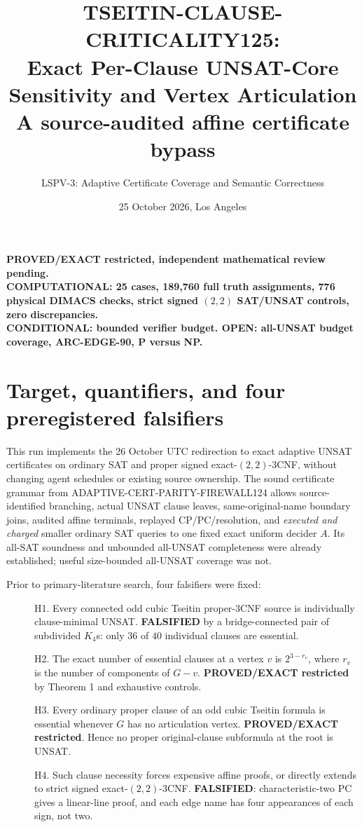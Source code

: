 \documentclass[11pt]{article}
\title{TSEITIN-CLAUSE-CRITICALITY125:\\Exact Per-Clause UNSAT-Core Sensitivity and Vertex Articulation\\\large A source-audited affine certificate bypass}
\author{LSPV-3: Adaptive Certificate Coverage and Semantic Correctness}
\date{25 October 2026, Los Angeles}
\begin{document}
\maketitle
\begin{center}
\textbf{PROVED/EXACT restricted, independent mathematical review pending.}\\
\textbf{COMPUTATIONAL: 25 cases, 189,760 full truth assignments, 776 physical DIMACS checks, strict signed $(2,2)$ SAT/UNSAT controls, zero discrepancies.}\\
\textbf{CONDITIONAL: bounded verifier budget. OPEN: all-UNSAT budget coverage, ARC-EDGE-90, P versus NP.}
\end{center}

\section{Target, quantifiers, and four preregistered falsifiers}
This run implements the 26 October UTC redirection to exact adaptive
UNSAT certificates on ordinary SAT and proper signed exact-$(2,2)$-3CNF,
without changing agent schedules or existing source ownership.
The sound certificate grammar from ADAPTIVE-CERT-PARITY-FIREWALL124
allows source-identified branching, actual UNSAT clause leaves,
same-original-name boundary joins, audited affine terminals, replayed
CP/PC/resolution, and \emph{executed and charged} smaller ordinary SAT
queries to one fixed exact uniform decider $A$.
Its all-SAT soundness and unbounded all-UNSAT completeness were already
established; useful size-bounded all-UNSAT coverage was not.

Prior to primary-literature search, four falsifiers were fixed:
\begin{description}
\item[] H1. Every connected odd cubic Tseitin proper-3CNF source
is individually clause-minimal UNSAT.
\textbf{FALSIFIED} by a bridge-connected pair of subdivided $K_4$s:
only $36$ of $40$ individual clauses are essential.
\item[] H2. The exact number of essential clauses at a vertex $v$
is $2^{3-r_v}$, where $r_v$ is the number of components of $G-v$.
\textbf{PROVED/EXACT restricted} by Theorem 1 and exhaustive controls.
\item[] H3. Every ordinary proper clause of an odd cubic Tseitin
formula is essential whenever $G$ has no articulation vertex.
\textbf{PROVED/EXACT restricted}. Hence no proper original-clause
subformula at the root is UNSAT.
\item[] H4. Such clause necessity forces expensive affine proofs, or
directly extends to strict signed exact-$(2,2)$-3CNF.
\textbf{FALSIFIED}: characteristic-two PC gives a linear-line proof,
and each edge name has four appearances of each sign, not two.
\end{description}
\end{document}
